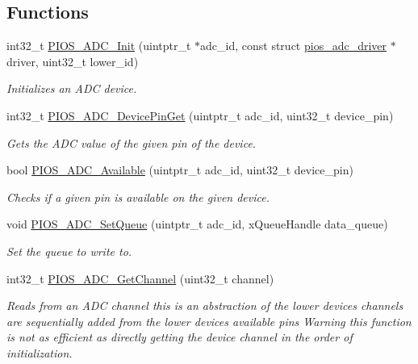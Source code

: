 \subsection*{\-Functions}
\begin{DoxyCompactItemize}
\item 
int32\-\_\-t \hyperlink{group___p_i_o_s___a_d_c_gae120a825a76a2207d0e90abd773f32fc}{\-P\-I\-O\-S\-\_\-\-A\-D\-C\-\_\-\-Init} (uintptr\-\_\-t $\ast$adc\-\_\-id, const struct \hyperlink{structpios__adc__driver}{pios\-\_\-adc\-\_\-driver} $\ast$driver, uint32\-\_\-t lower\-\_\-id)
\begin{DoxyCompactList}\small\item\em \-Initializes an \-A\-D\-C device. \end{DoxyCompactList}\item 
int32\-\_\-t \hyperlink{group___p_i_o_s___a_d_c_ga99e9080cf4eb3114f15ad00364a5b4d0}{\-P\-I\-O\-S\-\_\-\-A\-D\-C\-\_\-\-Device\-Pin\-Get} (uintptr\-\_\-t adc\-\_\-id, uint32\-\_\-t device\-\_\-pin)
\begin{DoxyCompactList}\small\item\em \-Gets the \-A\-D\-C value of the given pin of the device. \end{DoxyCompactList}\item 
bool \hyperlink{group___p_i_o_s___a_d_c_ga3f5f671e8a6057b26861ce21789f3733}{\-P\-I\-O\-S\-\_\-\-A\-D\-C\-\_\-\-Available} (uintptr\-\_\-t adc\-\_\-id, uint32\-\_\-t device\-\_\-pin)
\begin{DoxyCompactList}\small\item\em \-Checks if a given pin is available on the given device. \end{DoxyCompactList}\item 
void \hyperlink{group___p_i_o_s___a_d_c_ga0081adb4449c45987f2245cb3455b3e9}{\-P\-I\-O\-S\-\_\-\-A\-D\-C\-\_\-\-Set\-Queue} (uintptr\-\_\-t adc\-\_\-id, x\-Queue\-Handle data\-\_\-queue)
\begin{DoxyCompactList}\small\item\em \-Set the queue to write to. \end{DoxyCompactList}\item 
int32\-\_\-t \hyperlink{group___p_i_o_s___a_d_c_ga84f004e1278a4e7ae3539bc0ea138477}{\-P\-I\-O\-S\-\_\-\-A\-D\-C\-\_\-\-Get\-Channel} (uint32\-\_\-t channel)
\begin{DoxyCompactList}\small\item\em \-Reads from an \-A\-D\-C channel this is an abstraction of the lower devices channels are sequentially added from the lower devices available pins \-Warning this function is not as efficient as directly getting the device channel in the order of initialization. \end{DoxyCompactList}\item 

\end{DoxyCompactItemize}
